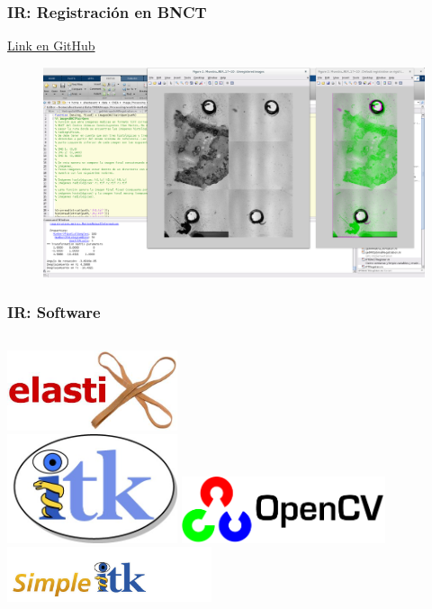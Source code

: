 \documentclass{beamer} %
\begin{document}
\begin{frame}
\end{frame}

\begin{frame}
\frametitle{IR: Registración en BNCT}

\href{https://github.com/ahestevenz/ip-image-registration}{Link en GitHub}

\begin{figure}
  \includegraphics[width=\textwidth]{images/IPTBNCTRegister.png}
\end{figure}

\end{frame}

\begin{frame}
\frametitle{IR: Software}

\begin{columns}[t]
\pause
\centering
\href{http://elastix.isi.uu.nl/}{\includegraphics[width=5cm]{images/logos/elastix.png}}\\
\pause
\href{https://itk.org/}{\includegraphics[width=5cm]{images/logos/itkLogo.jpg}}
\pause
\centering
\href{http://opencv.org/}{\includegraphics[width=6cm]{images/logos/opencv.png}}\\
\pause
\href{http://www.simpleitk.org/}{\includegraphics[width=6cm]{images/logos/simpleitk.png}}
\end{columns}

\end{frame}
\end{document}
